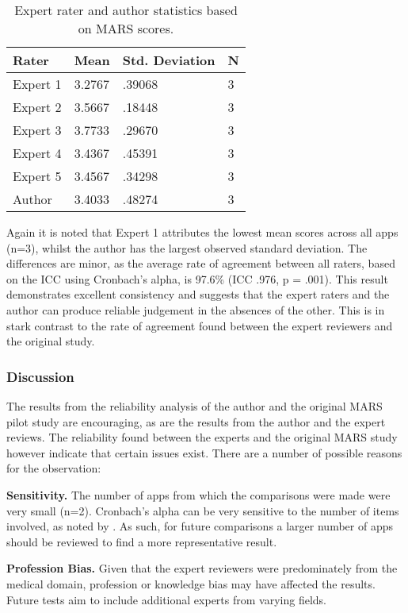 \begin{table}[h]
\centering
\caption{Expert rater and author statistics based on MARS scores.}
\label{tbl: expert-vs-author-apps-descriptive}
\begin{tabular}{@{}llll@{}}
\toprule
Rater      & Mean   & Std. Deviation & N \\ \midrule
Expert 1   & 3.2767 & .39068         & 3 \\
Expert 2 & 3.5667 & .18448         & 3 \\
Expert 3 & 3.7733 & .29670         & 3 \\
Expert 4  & 3.4367 & .45391         & 3 \\
Expert 5  & 3.4567 & .34298         & 3 \\
Author     & 3.4033 & .48274         & 3 \\ \bottomrule
\end{tabular}
\end{table}

Again it is noted that Expert 1 attributes the lowest mean scores across all apps (n=3), whilst the author has the largest observed standard deviation. The differences are minor, as the average rate of agreement between all raters, based on the ICC using Cronbach's alpha, is 97.6\% (ICC .976, p = .001). This result demonstrates excellent consistency and suggests that the expert raters and the author can produce reliable judgement in the absences of the other. This is in stark contrast to the rate of agreement found between the expert reviewers and the original study.

\subsubsection{Discussion}
The results from the reliability analysis of the author and the original MARS pilot study are encouraging, as are the results from the author and the expert reviews. The reliability found between the experts and the original MARS study however indicate that certain issues exist. There are a number of possible reasons for the observation: 

\textbf{Sensitivity.}
The number of apps from which the comparisons were made were very small (n=2). Cronbach’s alpha can be very sensitive to the number of items involved, as noted by \citeauthor{Clark1995} \cite{Clark1995}. As such, for future comparisons a larger number of apps should be reviewed to find a more representative result.

\textbf{Profession Bias.}
Given that the expert reviewers were predominately from the medical domain, profession or knowledge bias may have affected the results. Future tests aim to include additional experts from varying fields.

